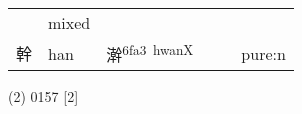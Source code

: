 \documentclass[14pt,a4paper]{scrartcl}
\begin{document}
\begin{longtable}[c]{@{}llllll@{}}
\begin{minipage}[t]{0.14\columnwidth}
\strut\end{minipage} &
\begin{minipage}[t]{0.14\columnwidth}\raggedright\strut
mixed
\strut\end{minipage}\tabularnewline
\begin{minipage}[t]{0.14\columnwidth}\raggedright\strut
幹
\strut\end{minipage} &
\begin{minipage}[t]{0.14\columnwidth}\raggedright\strut
han
\strut\end{minipage} &
\begin{minipage}[t]{0.14\columnwidth}\raggedright\strut
澣\textsuperscript{6fa3~hwanX}
\strut\end{minipage} &
\begin{minipage}[t]{0.14\columnwidth}\raggedright\strut
\strut\end{minipage} &
\begin{minipage}[t]{0.14\columnwidth}\raggedright\strut
\strut\end{minipage} &
\begin{minipage}[t]{0.14\columnwidth}\raggedright\strut
pure:n
\strut\end{minipage}\tabularnewline
\bottomrule
\end{longtable}

(2) 0157 {[}2{]}
\end{document}

